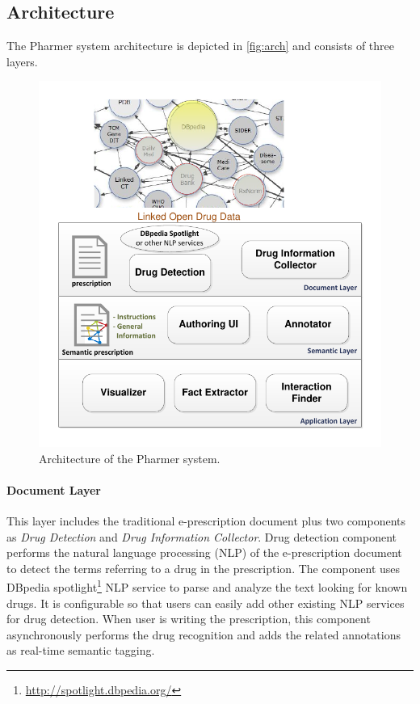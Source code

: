\documentclass[10pt, conference, compsocconf]{IEEEtran}
\begin{document}
\subsection{Architecture}

The Pharmer system architecture is depicted in \autoref{fig:arch} and consists of three layers.

\begin{figure}[tb]
	\centering
		\includegraphics[width=1.0\columnwidth]{images/architecture.pdf}
	\caption{Architecture of the Pharmer system.}
	\label{fig:arch}
\end{figure}

\paragraph{Document Layer} This layer includes the traditional e-prescription document plus two components as \emph{Drug Detection} and \emph{Drug Information Collector}.
Drug detection component performs the natural language processing (NLP) of the e-prescription document to detect the terms referring to a drug in the prescription.
The component uses DBpedia spotlight\footnote{\url{http://spotlight.dbpedia.org/}} NLP service to parse and analyze the text looking for known drugs.
It is configurable so that users can easily add other existing NLP services for drug detection.
When user is writing the prescription, this component asynchronously performs the drug recognition and adds the related annotations as real-time semantic tagging.
\end{document}
